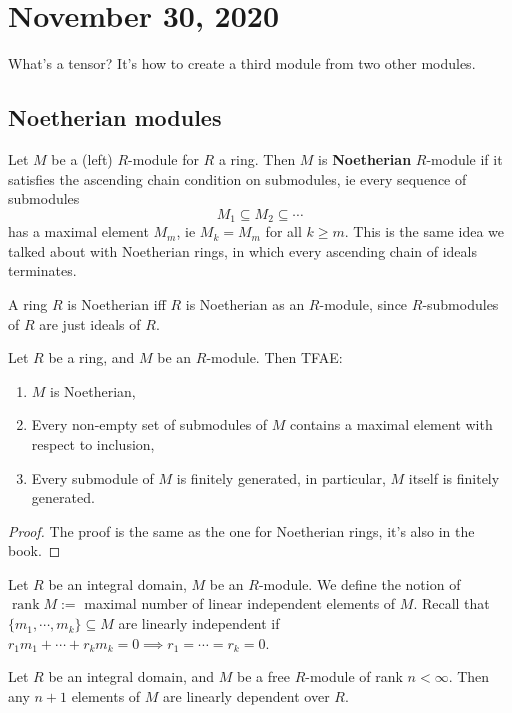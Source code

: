 \section{November 30, 2020}
What's a tensor? It's how to create a third module from two other modules.
\subsection{Noetherian modules}
\begin{definition}
    Let $M$ be a (left) $R$-module for $R$ a ring. Then $M$ is \textbf{Noetherian} $R$-module if it satisfies the ascending chain condition on submodules, ie every sequence of submodules \[
    M_1\subseteq M_2\subseteq \cdots 
    \] has a maximal element $M_m$, ie $M_k=M_m$ for all $k\geq m$. This is the same idea we talked about with Noetherian rings, in which every ascending chain of ideals terminates.
\end{definition}
\begin{note}
    A ring $R$ is Noetherian iff $R$ is Noetherian as an $R$-module, since $R$-submodules of $R$ are just ideals of $R$.
\end{note}
\begin{theorem}
   Let $R$ be a ring, and $M$ be an $R$-module. Then TFAE:
   \begin{enumerate}[label=\arabic*)]
       \item $M$ is Noetherian,
       \item Every non-empty set of submodules of $M$ contains a maximal element with respect to inclusion,
       \item Every submodule of $M$ is finitely generated, in particular, $M$ itself is finitely generated.
   \end{enumerate}
\end{theorem}
\begin{proof}
    The proof is the same as the one for Noetherian rings, it's also in the book.
\end{proof}
\begin{definition}[Rank]
    Let $R$ be an integral domain, $M$ be an $R$-module. We define the notion of $\operatorname{rank}M:=$ maximal number of linear independent elements of $M$. Recall that $\{m_1,\cdots ,m_k \}\subseteq M   $ are linearly independent if $r_1m_1+\cdots +r_km_k=0 \implies r_1= \cdots =r_k=0$.
\end{definition}
\begin{prop}
    Let $R$ be an integral domain, and $M$ be a free $R$-module of rank $n<\infty$. Then any $n+1$ elements of $M$ are linearly dependent over $R$.
\end{prop}
